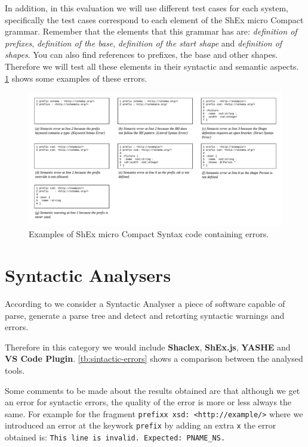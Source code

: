 In addition, in this evaluation we will use different test cases for each system, specifically the test cases
correspond to each element of the ShEx micro Compact grammar. Remember that the elements that this grammar has
are: \textit{definition of prefixes}, \textit{definition of the base}, \textit{definition of the start shape} and
\textit{definition of shapes}. You can also find references to prefixes, the base and other shapes.
Therefore we will test all these elements in their syntactic and semantic aspects. \cref{fig:shexc-micro-errors}
shows some examples of these errors.

\begin{figure}
    \includegraphics[width=\textwidth]{images/shexc-micro-bad-examples.pdf}
    \centering
    \caption[Examples of ShEx micro Compact Syntax code containing syntactic and semantic errors or warnings]{Examples of ShEx micro Compact Syntax
    code containing errors.}
    \label{fig:shexc-micro-errors}
  \end{figure}

\section{Syntactic Analysers}
According to \cite{floyd1963syntactic} we consider a Syntactic Analyser a piece of software capable of parse, generate
a parse tree and detect and retorting syntactic warnings and errors.

Therefore in this category we would include \textbf{Shaclex}, \textbf{ShEx.js}, \textbf{YASHE} and \textbf{VS Code Plugin}.
\cref{tb:sintactic-errors} shows a comparison between the analysed tools.

Some comments to be made about the results obtained are that although we get an error for syntactic errors,
the quality of the error is more or less always the same. For example for the fragment \texttt{prefixx xsd: <http://example/>}
where we introduced an error at the keywork \texttt{prefix} by adding an extra \texttt{x} the error obtained is: \texttt{This line is invalid. Expected: PNAME\_NS.}

